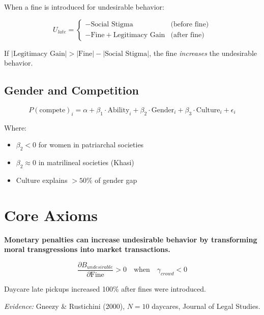 When a fine is introduced for undesirable behavior:

\begin{equation}
U_{late} = \begin{cases}
-\text{Social Stigma} & \text{(before fine)} \\
-\text{Fine} + \text{Legitimacy Gain} & \text{(after fine)}
\end{cases}
\end{equation}

If $|\text{Legitimacy Gain}| > |\text{Fine}| - |\text{Social Stigma}|$, the fine \textit{increases} the undesirable behavior.

\subsection{Gender and Competition}

\begin{equation}
P(\text{compete})_i = \alpha + \beta_1 \cdot \text{Ability}_i + \beta_2 \cdot \text{Gender}_i + \beta_3 \cdot \text{Culture}_i + \epsilon_i
\end{equation}

Where:
\begin{itemize}
    \item $\beta_2 < 0$ for women in patriarchal societies
    \item $\beta_2 \approx 0$ in matrilineal societies (Khasi)
    \item Culture explains $>50\%$ of gender gap
\end{itemize}

\section{Core Axioms}

\begin{tcolorbox}[colback=red!5!white,colframe=red!75!black,title=Axiom GN-1: A Fine is a Price]
\textbf{Monetary penalties can increase undesirable behavior by transforming moral transgressions into market transactions.}

\begin{equation}
\frac{\partial B_{undesirable}}{\partial \text{Fine}} > 0 \quad \text{when} \quad \gamma_{crowd} < 0
\end{equation}

Daycare late pickups increased 100\% after fines were introduced.

\textit{Evidence:} Gneezy \& Rustichini (2000), $N=10$ daycares, Journal of Legal Studies.
\end{tcolorbox}

